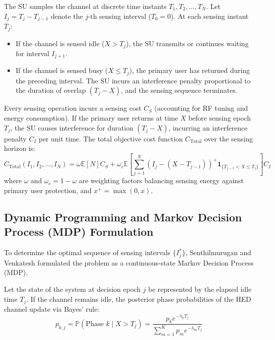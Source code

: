 The SU samples the channel at discrete time instants $T_1, T_2, \dots, T_N$. Let $I_j = T_j - T_{j-1}$ denote the $j$-th sensing interval ($T_0 = 0$). At each sensing instant $T_j$:
\begin{itemize}
    \item If the channel is sensed idle ($X > T_j$), the SU transmits or continues waiting for interval $I_{j+1}$.
    \item If the channel is sensed busy ($X \le T_j$), the primary user has returned during the preceding interval. The SU incurs an interference penalty proportional to the duration of overlap $(T_j - X)$, and the sensing sequence terminates.
\end{itemize}

Every sensing operation incurs a sensing cost $C_S$ (accounting for RF tuning and energy consumption). If the primary user returns at time $X$ before sensing epoch $T_j$, the SU causes interference for duration $(T_j - X)$, incurring an interference penalty $C_I$ per unit time. The total objective cost function $C_{\mathrm{Total}}$ over the sensing horizon is:
\begin{equation}
    \label{eq:cr_sensing_total_cost}
    C_{\mathrm{Total}}(I_1, I_2, \dots, I_N) = \omega \mathbb{E}[N] C_S + \omega_c \mathbb{E}\left[ \sum_{j=1}^N (I_j - (X - T_{j-1}))^+ \mathbf{1}_{\{T_{j-1} < X \le T_j\}} \right] C_I
\end{equation}
where $\omega$ and $\omega_c = 1 - \omega$ are weighting factors balancing sensing energy against primary user protection, and $x^+ = \max(0, x)$.

\subsection{Dynamic Programming and Markov Decision Process (MDP) Formulation}
To determine the optimal sequence of sensing intervals $\{I_j^*\}$, Senthilmurugan and Venkatesh \cite{senthilmurugan2017optimal} formulated the problem as a continuous-state Markov Decision Process (MDP).

Let the state of the system at decision epoch $j$ be represented by the elapsed idle time $T_j$. If the channel remains idle, the posterior phase probabilities of the HED channel update via Bayes' rule:
\begin{equation}
    p_{k, j} = \mathbb{P}(\text{Phase } k \mid X > T_j) = \frac{p_k e^{-\lambda_k T_j}}{\sum_{m=1}^K p_m e^{-\lambda_m T_j}}
\end{equation}

